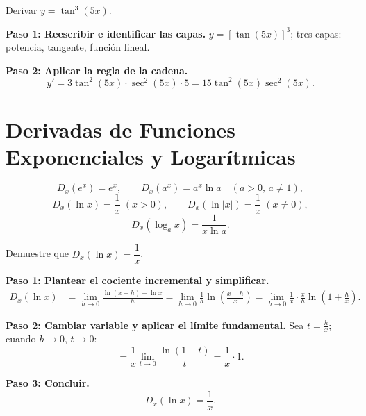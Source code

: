 \begin{example}
Derivar $y = \tan^3(5x)$.

\begin{myproof}

\textbf{Paso 1: Reescribir e identificar las capas.}
$y = [\tan(5x)]^3$; tres capas: potencia, tangente, función lineal.

\textbf{Paso 2: Aplicar la regla de la cadena.}
\[
\boxed{y' = 3\tan^2(5x)\cdot\sec^2(5x)\cdot 5 = 15\tan^2(5x)\sec^2(5x).}
\]
\end{myproof}
\end{example}

\section{Derivadas de Funciones Exponenciales y Logarítmicas}

\begin{theorem}
\[
D_x(e^x) = e^x, \qquad D_x(a^x) = a^x\ln a \quad (a>0,\, a\neq 1),
\]
\[
D_x(\ln x) = \frac{1}{x} \;(x>0), \qquad
D_x(\ln|x|) = \frac{1}{x} \;(x\neq 0),
\]
\[
D_x(\log_a x) = \frac{1}{x\ln a}.
\]
\end{theorem}

\begin{example}
Demuestre que $D_x(\ln x) = \dfrac{1}{x}$.

\begin{myproof}

\textbf{Paso 1: Plantear el cociente incremental y simplificar.}
\begin{align*}
D_x(\ln x) &= \lim_{h\to 0}\frac{\ln(x+h)-\ln x}{h}
= \lim_{h\to 0}\frac{1}{h}\ln\!\left(\frac{x+h}{x}\right)
= \lim_{h\to 0}\frac{1}{x}\cdot\frac{x}{h}\ln\!\left(1+\frac{h}{x}\right).
\end{align*}

\textbf{Paso 2: Cambiar variable y aplicar el límite fundamental.}
Sea $t = \frac{h}{x}$; cuando $h\to 0$, $t\to 0$:
\[
= \frac{1}{x}\lim_{t\to 0}\frac{\ln(1+t)}{t} = \frac{1}{x}\cdot 1.
\]

\textbf{Paso 3: Concluir.}
\[
\boxed{D_x(\ln x) = \frac{1}{x}.}
\]
\end{myproof}
\end{example}



